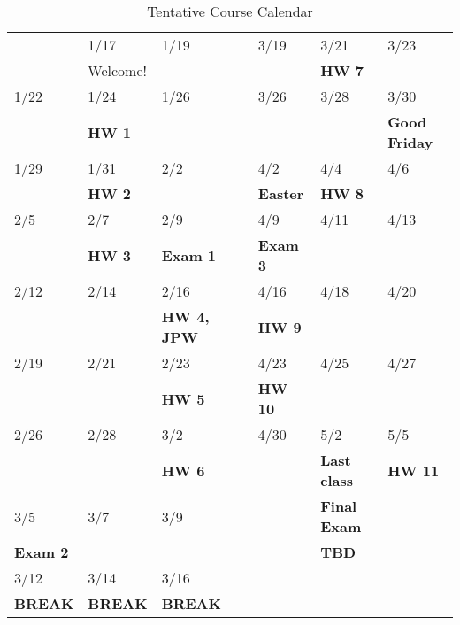 \documentclass[11pt]{article}
\begin{document}
\begin{table}[htbp]
\caption{Tentative Course Calendar}
\centering
\begin{tabular}{lllllll}
\hline
 & 1/17 & 1/19 & \quad\quad\quad & 3/19 & 3/21 & 3/23\\
 & Welcome! &  &  &  & \textbf{HW 7} & \\
\hline
1/22 & 1/24 & 1/26 &  & 3/26 & 3/28 & 3/30\\
 & \textbf{HW 1} &  &  &  &  & \textbf{Good Friday}\\
\hline
1/29 & 1/31 & 2/2 &  & 4/2 & 4/4 & 4/6\\
 & \textbf{HW 2} &  &  & \textbf{Easter} & \textbf{HW 8} & \\
\hline
2/5 & 2/7 & 2/9 &  & 4/9 & 4/11 & 4/13\\
 & \textbf{HW 3} & \textbf{Exam 1} &  & \textbf{Exam 3} &  & \\
\hline
2/12 & 2/14 & 2/16 &  & 4/16 & 4/18 & 4/20\\
 &  & \textbf{HW 4, JPW} &  & \textbf{HW 9} &  & \\
\hline
2/19 & 2/21 & 2/23 &  & 4/23 & 4/25 & 4/27\\
 &  & \textbf{HW 5} &  & \textbf{HW 10} &  & \\
\hline
2/26 & 2/28 & 3/2 &  & 4/30 & 5/2 & 5/5\\
 &  & \textbf{HW 6} &  &  & \textbf{Last class} & \textbf{HW 11}\\
\hline
3/5 & 3/7 & 3/9 &  &  & \textbf{Final Exam} & \\
\textbf{Exam 2} &  &  &  &  & \textbf{TBD} & \\
\hline
3/12 & 3/14 & 3/16 &  &  &  & \\
\textbf{BREAK} & \textbf{BREAK} & \textbf{BREAK} &  &  &  & \\
\hline
\end{tabular}
\end{table}
\end{document}
